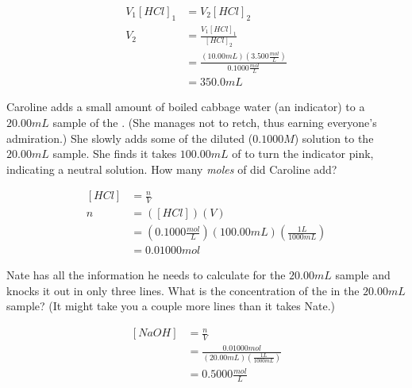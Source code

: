 \documentclass[11pt,addpoints]{exam}   	%
\begin{document}
\begin{questions}
\begin{solution}
\begin{equation} 
\begin{split}
   V_1 [HCl]_1 &= V_2 [HCl]_2 \\
   V_2 &= \frac{V_1 [HCl]_1} {[HCl]_2} \\
          &= \frac{(10.00 mL)(3.500 \frac{mol}{L} )}{0.1000 \frac{mol}{L}} \\
          &= 350.0 mL
 \end{split}
 \end{equation}
\end{solution}

\vspace{0.2in}

\question[5] Caroline adds a small amount of boiled cabbage water (an indicator) to a $20.00 mL$ sample of the . 
(She manages not to retch, thus earning everyone's admiration.) 
She slowly adds some of the diluted ($0.1000 M$)  solution to the $20.00 mL$  sample. 
She finds it takes $100.00 mL$ of  to turn the indicator pink, indicating a neutral solution.
How many \emph{moles} of  did Caroline add?

\begin{solution}
\begin{equation} 
\begin{split}
   [HCl] &= \frac{n}{V} \\
        n  &= ([HCl])(V) \\
            &= (0.1000 \frac{mol}{L}) (100.00 mL) (\frac{1 L}{1000 mL}) \\
            &= 0.01000 mol 
 \end{split}
 \end{equation}
\end{solution}

\vspace{0.2in}

\clearpage
\question[5] Nate has all the information he needs to calculate \ce{[NaOH]} for the $20.00 mL$ sample and knocks it out in only three lines. 
What is the concentration of the  in the $20.00 mL$ sample?
(It might take you a couple more lines than it takes Nate.)

\begin{solution}
\begin{equation} 
\begin{split}
   [NaOH] &= \frac{n}{V} \\
                &= \frac{0.01000 mol}{(20.00 mL)(\frac{1 L}{1000 mL})} \\
                &= 0.5000 \frac{mol}{L}
 \end{split}
 \end{equation}
\end{solution}


\end{questions}
\end{document}
